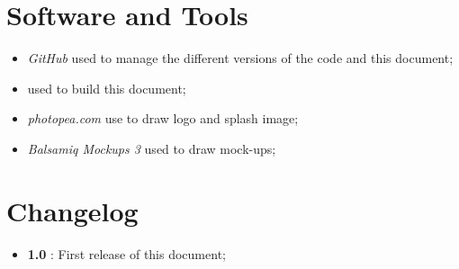 \section{Software and Tools}
\begin{itemize}
  
  \item \textit{GitHub} used to manage the different versions of the code and this document;
  \item \text{\LaTeX} used to build this document;
  \item \textit{photopea.com} use to draw logo and splash image;
  \item \textit{Balsamiq Mockups 3} used to draw mock-ups;
\end{itemize}


\section{Changelog} \label{Changelog}
\begin{itemize}
  \item \textbf{1.0} : First release of this document;
\end{itemize}